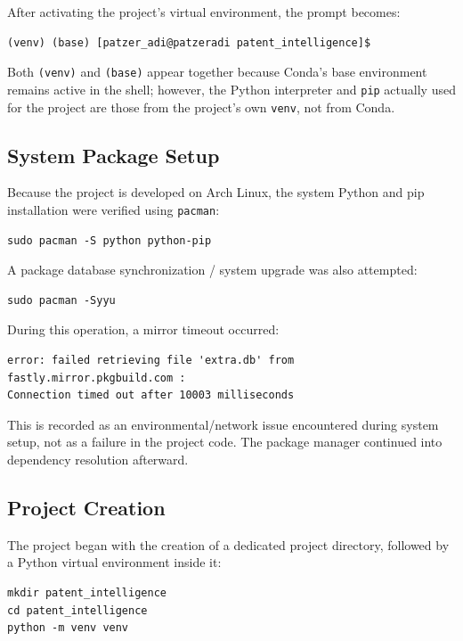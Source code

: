 \documentclass[11pt]{article}
\begin{document}
\noindent After activating the project's virtual environment, the prompt becomes:

\begin{lstlisting}
(venv) (base) [patzer_adi@patzeradi patent_intelligence]$
\end{lstlisting}

\noindent Both \texttt{(venv)} and \texttt{(base)} appear together because Conda's base environment remains active in the shell; however, the Python interpreter and \texttt{pip} actually used for the project are those from the project's own \texttt{venv}, not from Conda.

\subsection{System Package Setup}

Because the project is developed on Arch Linux, the system Python and pip installation were verified using \texttt{pacman}:

\begin{lstlisting}
sudo pacman -S python python-pip
\end{lstlisting}

A package database synchronization / system upgrade was also attempted:

\begin{lstlisting}
sudo pacman -Syyu
\end{lstlisting}

\noindent During this operation, a mirror timeout occurred:

\begin{lstlisting}
error: failed retrieving file 'extra.db' from fastly.mirror.pkgbuild.com :
Connection timed out after 10003 milliseconds
\end{lstlisting}

\noindent This is recorded as an environmental/network issue encountered during system setup, not as a failure in the project code. The package manager continued into dependency resolution afterward.

\subsection{Project Creation}

The project began with the creation of a dedicated project directory, followed by a Python virtual environment inside it:

\begin{lstlisting}
mkdir patent_intelligence
cd patent_intelligence
python -m venv venv
\end{lstlisting}
\end{document}
